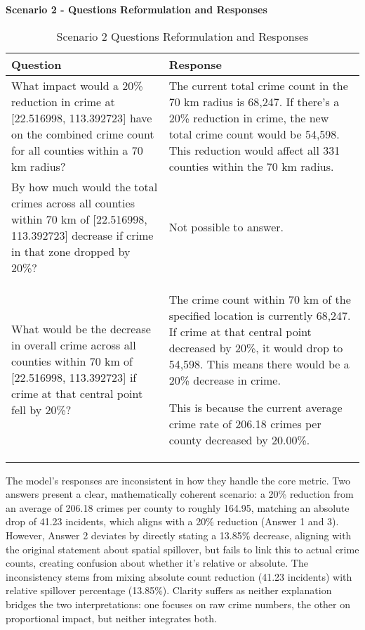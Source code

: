 \noindent \textbf{Scenario 2 - Questions Reformulation and Responses}
\begin{table}[hbtp]
\centering
\small
\begin{tabular}{|p{}|p{}|}
\hline
\textbf{Question} & \textbf{Response} \\
\hline
What impact would a 20\% reduction in crime at [22.516998, 113.392723] have on the combined crime count for all counties within a 70 km radius? & The current total crime count in the 70 km radius is 68,247. If there's a 20\% reduction in crime, the new total crime count would be 54,598. This reduction would affect all 331 counties within the 70 km radius. \\
\hline
 By how much would the total crimes across all counties within 70 km of [22.516998, 113.392723] decrease if crime in that zone dropped by 20\%? & Not possible to answer. \\
\hline
What would be the decrease in overall crime across all counties within 70 km of [22.516998, 113.392723] if crime at that central point fell by 20\%? & 
The crime count within 70 km of the specified location is currently 68,247. If crime at that central point decreased by 20\%, it would drop to 54,598. This means there would be a 20\% decrease in crime.

This is because the current average crime rate of 206.18 crimes per county decreased by 20.00\%. \\
\hline
\end{tabular}
\caption{Scenario 2 Questions Reformulation and Responses}
\label{tab:questions_responses_2}
\end{table}

The model's responses are inconsistent in how they handle the core metric. Two answers present a clear, mathematically coherent scenario: a 20\% reduction from an average of 206.18 crimes per county to roughly 164.95, matching an absolute drop of 41.23 incidents, which aligns with a 20\% reduction (Answer 1 and 3). However, Answer 2 deviates by directly stating a 13.85\% decrease, aligning with the original statement about spatial spillover, but fails to link this to actual crime counts, creating confusion about whether it's relative or absolute. The inconsistency stems from mixing absolute count reduction (41.23 incidents) with relative spillover percentage (13.85\%). Clarity suffers as neither explanation bridges the two interpretations: one focuses on raw crime numbers, the other on proportional impact, but neither integrates both.


